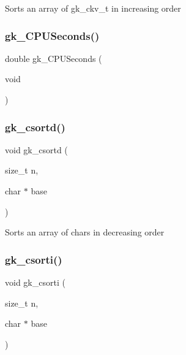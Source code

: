 Sorts an array of gk\+\_\+ckv\+\_\+t in increasing order \mbox{\label{a00077_a3e9b43a695411f5f0b3396083fe688d6}} 
\subsubsection{\texorpdfstring{gk\+\_\+\+C\+P\+U\+Seconds()}{gk\_CPUSeconds()}}
{\footnotesize\ttfamily double gk\+\_\+\+C\+P\+U\+Seconds (\begin{DoxyParamCaption}\item[{void}]{ }\end{DoxyParamCaption})}

\mbox{\label{a00077_a79f6ece86c0673dfb80fe52796de8fab}} 
\subsubsection{\texorpdfstring{gk\+\_\+csortd()}{gk\_csortd()}}
{\footnotesize\ttfamily void gk\+\_\+csortd (\begin{DoxyParamCaption}\item[{size\+\_\+t}]{n,  }\item[{char $\ast$}]{base }\end{DoxyParamCaption})}

Sorts an array of chars in decreasing order \mbox{\label{a00077_ae4a729a99be8753a82acb031b3d78434}} 
\subsubsection{\texorpdfstring{gk\+\_\+csorti()}{gk\_csorti()}}
{\footnotesize\ttfamily void gk\+\_\+csorti (\begin{DoxyParamCaption}\item[{size\+\_\+t}]{n,  }\item[{char $\ast$}]{base }\end{DoxyParamCaption})}

